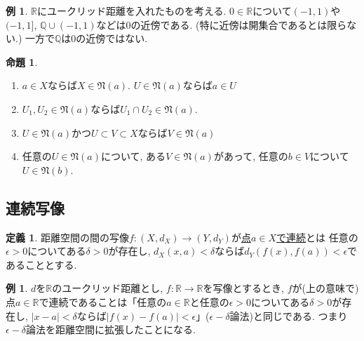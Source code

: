 \documentclass[dvipdfmx,a4paper,11pt]{article}
\newcommand{\R}{\mathbb{R}}
\newcommand{\Q}{\mathbb{Q}}
\theoremstyle{definition}
\newtheorem{prop}[thm]{命題}
\newtheorem{dfn}[thm]{定義}
\newtheorem{exa}[thm]{例}
\begin{document}
 \begin{exa}
 $\R$にユークリッド距離を入れたものを考える. 
 $0 \in \R$について$(-1,1)$や$(-1,1]$, $\Q \cup (-1,1)$などは$0$の近傍である. (特に近傍は開集合であるとは限らない.)
 一方で$\Q$は$0$の近傍ではない.
 \end{exa}

 
   \begin{tcolorbox}[
    colback = white,
    colframe = green!35!black,
    fonttitle = \bfseries,
    breakable = true]
    \begin{prop}
    \text{}
    \begin{enumerate}
     \setlength{\parskip}{0cm} 
  \setlength{\itemsep}{0cm} 
    \item $a \in X$ならば$X \in \mathfrak{N}(a)$. $U \in \mathfrak{N}(a)$ならば$a \in U$
    \item $U_1, U_2 \in \mathfrak{N}(a)$ならば$U_1 \cap U_2 \in \mathfrak{N}(a)$.
    \item $U \in \mathfrak{N}(a)$かつ$U \subset V \subset X$ならば$V  \in \mathfrak{N}(a)$
    \item 任意の$U \in \mathfrak{N}(a)$について, ある$V \in \mathfrak{N}(a)$があって, 任意の$b \in V$について$U \in \mathfrak{N}(b)$.
    \end{enumerate}
  \end{prop}
 \end{tcolorbox}
 
 \subsection{連続写像}
 
   \begin{tcolorbox}[
    colback = white,
    colframe = green!35!black,
    fonttitle = \bfseries,
    breakable = true]
    \begin{dfn}
    \text{}
距離空間の間の写像$f : (X, d_X) \rightarrow (Y, d_Y)$が\underline{点$a \in X$で連続}とは
任意の$\epsilon>0$についてある$\delta >0$が存在し, $d_X(x,a) < \delta$ならば$d_Y(f(x),f(a)) < \epsilon$であることとする.
  \end{dfn}
 \end{tcolorbox}
  \begin{exa}
  $d$を$\R$のユークリッド距離とし, $f : \R \rightarrow \R$を写像とするとき, $f$が(上の意味で)点$a \in \R$で連続であることは「任意の$a \in \R$と任意の$\epsilon>0$についてある$\delta >0$が存在し, $|x-a| < \delta$ならば$|f(x)- f(a)| < \epsilon$」($\epsilon-\delta$論法)と同じである. つまり$\epsilon-\delta$論法を距離空間に拡張したことになる.
 \end{exa}
 
\end{document}
